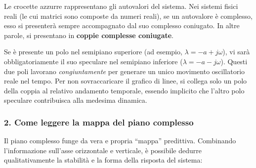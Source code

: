 \documentclass[a4paper,12pt]{article}
\begin{document}
	Le crocette azzurre rappresentano gli autovalori del sistema. Nei sistemi fisici reali (le cui matrici sono composte da numeri reali), se un autovalore è complesso, esso si presenterà sempre accompagnato dal suo complesso coniugato. In altre parole, si presentano in \textbf{coppie complesse coniugate}. 
	
	Se è presente un polo nel semipiano superiore (ad esempio, $\lambda = -a + j\omega$), vi sarà obbligatoriamente il suo speculare nel semipiano inferiore ($\lambda = -a - j\omega$). Questi due poli lavorano \textit{congiuntamente} per generare un unico movimento oscillatorio reale nel tempo. Per non sovraccaricare il grafico di linee, si collega solo un polo della coppia al relativo andamento temporale, essendo implicito che l'altro polo speculare contribuisca alla medesima dinamica.
	
	\subsubsection*{2. Come leggere la mappa del piano complesso}
	
	Il piano complesso funge da vera e propria ``mappa'' predittiva. Combinando l'informazione sull'asse orizzontale e verticale, è possibile dedurre qualitativamente la stabilità e la forma della risposta del sistema:
	
\end{document}
